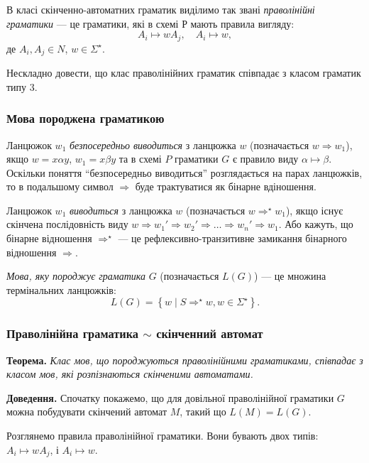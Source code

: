 В класі скінченно-автоматних граматик виділимо так звані \textit{праволінійні граматики} --- це граматики, які в схемі Р мають правила вигляду:
\begin{equation}
    A_i \mapsto w A_j, \quad A_i \mapsto w,
\end{equation}
де $A_i, A_j \in N$, $w \in \Sigma^\star$. \medskip

Нескладно довести, що клас праволінійних граматик співпадає з класом граматик типу 3.

\subsubsection{Мова породжена граматикою}

Ланцюжок $w_1$ \textit{безпосередньо виводиться} з ланцюжка $w$ (позначається $w \Rightarrow w_1$), якщо $w = x \alpha y$, $w_1 = x \beta y$ та в схемі $P$ граматики $G$ є правило виду $\alpha \mapsto \beta$. Оскільки поняття ``безпосередньо виводиться'' розглядається на парах ланцюжків, то в подальшому символ $\Rightarrow$ буде трактуватися як бінарне вдіношення. \medskip

Ланцюжок $w_1$ \textit{виводиться} з ланцюжка $w$ (позначається $w \Rightarrow^\star w_1$), якщо існує скінчена послідовність виду $w \Rightarrow w_1' \Rightarrow w_2' \Rightarrow \ldots \Rightarrow w_n' \Rightarrow w_1$. Або кажуть, що бінарне відношення $\Rightarrow^\star$ --- це рефлексивно-транзитивне замикання бінарного відношення $\Rightarrow$. \medskip

\textit{Мова, яку породжує граматика} $G$ (позначається $L(G)$) --- це множина термінальних ланцюжків: 
\begin{equation}
    L(G) = \left\{ w \mid S \Rightarrow^\star w, w \in \Sigma^\star \right\}.
\end{equation}

\subsubsection{Праволінійна граматика \texorpdfstring{$\sim$}{~} скінченний автомат}

\textbf{Теорема.} \textit{Клас мов, що породжуються праволінійними граматиками, співпадає з класом мов, які розпізнаються скінченими автоматами.}

\textbf{Доведення.} Спочатку покажемо, що для довільної праволінійної граматики $G$ можна побудувати скінчений автомат $M$, такий що $L(M) = L(G)$. \medskip

Розглянемо правила праволінійної граматики. Вони бувають двох типів: $A_i \mapsto w A_j$, і $A_i \mapsto w$. \medskip

